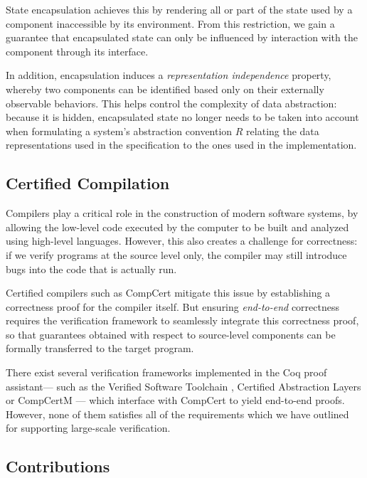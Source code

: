 \documentclass[acmsmall,screen,review,anonymous]{acmart}
\begin{document}
State encapsulation achieves this by rendering
all or part of the state used by a component
inaccessible by its environment.
From this restriction,
we gain a guarantee that
encapsulated state can only be influenced
by interaction with the component through its interface.

In addition,
encapsulation induces a \emph{representation independence} property,
whereby two components can be identified
based only on their externally observable behaviors.
This helps control the complexity of data abstraction:
because it is hidden,
encapsulated state no longer needs to be taken into account
when formulating a system's abstraction convention $R$
relating the data representations used in the specification
to the ones used in the implementation.


\subsection{Certified Compilation} %

Compilers play a critical role
in the construction of modern software systems,
by allowing the low-level code
executed by the computer
to be built and analyzed
using high-level languages.
However, this also creates a challenge
for correctness:
if we verify programs at the source level only,
the compiler may still introduce bugs
into the code that is actually run.

Certified compilers such as CompCert \cite{compcert}
mitigate this issue by
establishing a correctness proof for the compiler itself.
But ensuring \emph{end-to-end} correctness
requires the verification framework to seamlessly integrate
this correctness proof,
so that guarantees obtained with respect to source-level components
can be formally transferred to the target program.

There exist several verification frameworks
implemented in the Coq proof assistant---%
such as the Verified Software Toolchain \cite{vst}, Certified Abstraction Layers \cite{popl15} or
CompCertM \cite{compcertm}---%
which interface with CompCert to yield end-to-end proofs.
However,
none of them satisfies all of
the requirements which we have outlined
for supporting large-scale verification.


\subsection{Contributions} %
\end{document}
